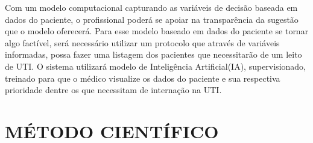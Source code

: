 \documentclass[12pt]{article}
\begin{document}
Com um modelo computacional capturando as variáveis de decisão baseada em dados do paciente, o profissional poderá se apoiar na transparência da sugestão que o modelo oferecerá. Para esse modelo baseado em dados do paciente se tornar algo factível, será necessário utilizar um protocolo que através de variáveis informadas, possa fazer uma listagem dos pacientes que necessitarão de um leito de UTI. O sistema utilizará modelo de Inteligência Artificial(IA), supervisionado, treinado para que o médico visualize os dados do paciente e sua respectiva prioridade dentre os que necessitam de internação na UTI.


\section{MÉTODO CIENTÍFICO}
\end{document}
